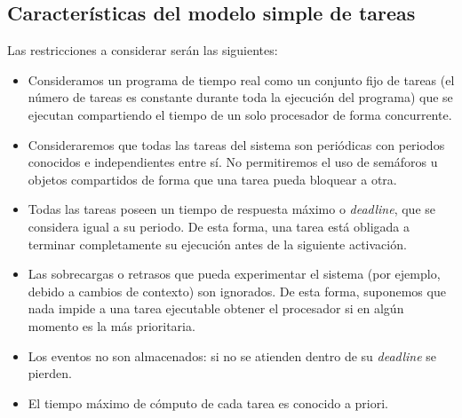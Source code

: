 \subsection{Características del modelo simple de tareas}
Las restricciones a considerar serán las siguientes:
\begin{itemize}
    \item Consideramos un programa de tiempo real como un conjunto fijo de tareas (el número de tareas es constante durante toda la ejecución del programa) que se ejecutan compartiendo el tiempo de un solo procesador de forma concurrente.
    \item Consideraremos que todas las tareas del sistema son periódicas con periodos conocidos e independientes entre sí. No permitiremos el uso de semáforos u objetos compartidos de forma que una tarea pueda bloquear a otra.
    \item Todas las tareas poseen un tiempo de respuesta máximo o \textit{deadline}, que se considera igual a su periodo. De esta forma, una tarea está obligada a terminar completamente su ejecución antes de la siguiente activación.
    \item Las sobrecargas o retrasos que pueda experimentar el sistema (por ejemplo, debido a cambios de contexto) son ignorados. De esta forma, suponemos que nada impide a una tarea ejecutable obtener el procesador si en algún momento es la más prioritaria.
    \item Los eventos no son almacenados: si no se atienden dentro de su \textit{deadline} se pierden.
    \item El tiempo máximo de cómputo de cada tarea es conocido a priori.
\end{itemize}

